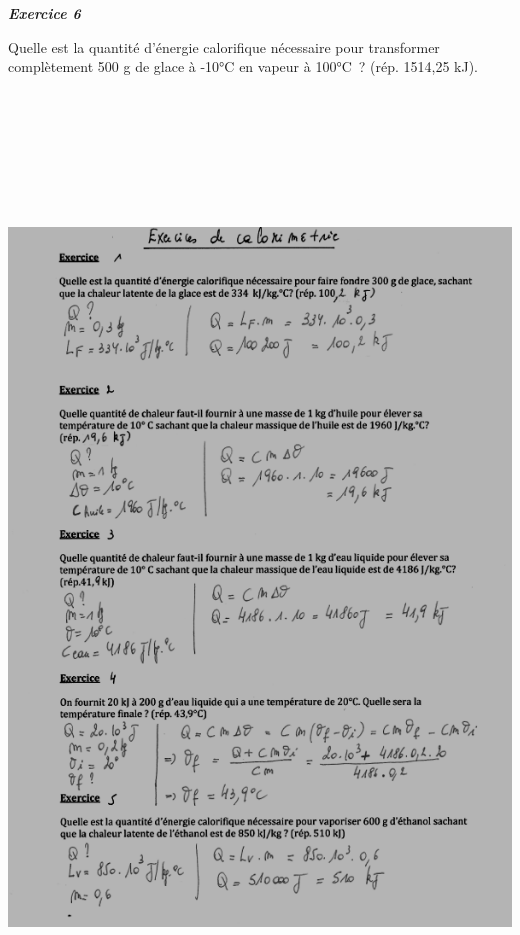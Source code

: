 \emph{\textbf{Exercice 6}}

Quelle est la quantité d'énergie calorifique nécessaire pour transformer
complètement 500 g de glace à -10°C en vapeur à 100°C~? (rép. 1514,25
kJ).

\includegraphics[width=18.486cm,height=25.73cm]{Pictures/100000010000024E00000334339B3944B6446F24.png}

